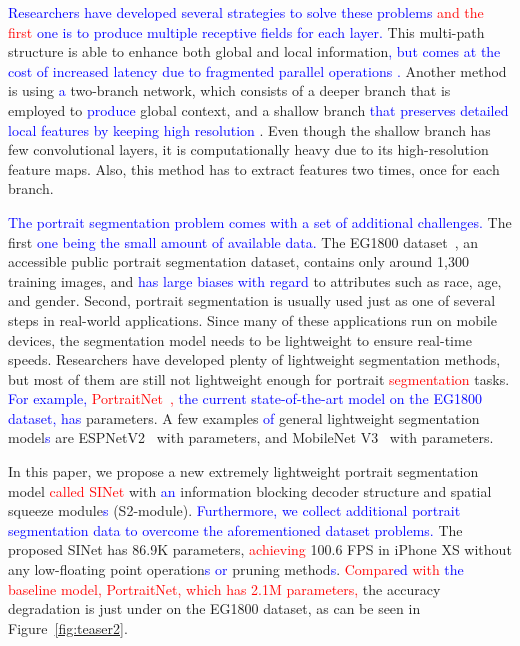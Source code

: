 \documentclass[10pt,twocolumn,letterpaper]{article}
\newcommand\Lars[1]{\textcolor{blue}{#1}}
\newcommand\nj[1]{\textcolor{red}{#1}}
\newcommand\Lars[1]{#1}
\newcommand\nj[1]{#1}
\begin{document}
\Lars{Researchers have developed several strategies to solve these problems}
\nj{and the first}
\Lars{one is to produce multiple receptive fields for each layer.} 
This multi-path structure is able to enhance both global and local information\Lars{, but comes at the cost of increased latency due to fragmented parallel operations \cite{ma2018shufflenet}. }Another method is using \Lars{a} two-branch network, which consists of a deeper branch that is employed to \Lars{produce} global context, and a shallow branch \Lars{that preserves detailed local features by keeping high resolution} \cite{poudel2018contextnet, poudel2019fast, yu2018bisenet}.
Even though the shallow branch has few convolutional layers, it is computationally heavy due to its high-resolution feature maps.
Also, this method has to extract features two times, once for each branch.

\Lars{The portrait segmentation problem comes with a set of additional challenges.}
The first \Lars{one being the small amount of available data.} The EG1800 dataset~\cite{shen2016automatic}, an accessible public portrait segmentation dataset, contains only around 1,300 training images, and \Lars{has large biases with regard }to attributes such as race, age, and gender. 
Second, portrait segmentation is usually used just as one of several steps in real-world applications. 
Since many of these applications run on mobile devices, the segmentation model needs to be lightweight to ensure real-time speeds.
Researchers have developed plenty of lightweight segmentation methods, but most of them are still not lightweight enough for portrait \nj{segmentation} tasks. \Lars{For example, \nj{PortraitNet~\cite{zhang2019portraitnet},} the current state-of-the-art model on the EG1800 dataset, has}  parameters. A few examples \Lars{of} general lightweight segmentation model\Lars{s} are ESPNetV2~\cite{mehta2018espnetv2} with  parameters, and MobileNet V3~\cite{howard2019searching} with  parameters. 



 In this paper, we propose a new extremely lightweight portrait segmentation model \nj{called SINet} with \Lars{an} information blocking decoder structure and spatial squeeze module\Lars{s} (S2-module).
\Lars{Furthermore, we collect additional portrait segmentation data to overcome the aforementioned dataset problems. }
The proposed SINet has 86.9K parameters, \nj{achieving} 100.6 FPS in iPhone XS without any low-floating point operation\Lars{s or} pruning method\Lars{s}. 
\nj{Compar\Lars{ed} with \Lars{the} baseline model, PortraitNet, which has 2.1M parameters,} the accuracy degradation is just under  on the EG1800 dataset, as can be seen in Figure~\ref{fig:teaser2}.
\end{document}

